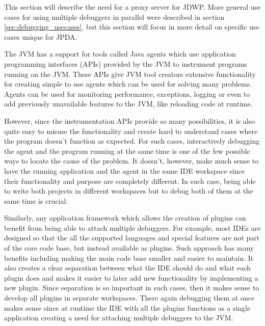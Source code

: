 \documentclass[..thesis.tex]{subfiles}
\begin{document}
This section will describe the need for a proxy server for JDWP.
More general use cases for using multiple debuggers in parallel were described in section \ref{sec:debugging_usecases}, but this section will focus in more detail on specific use cases unique for JPDA.

The JVM has a support for tools called Java agents which use application programming interfaces (APIs) provided by the JVM to instrument programs running on the JVM.
These APIs give JVM tool creators extensive functionality for creating simple to use agents which can be used for solving many problems.
Agents can be used for monitoring performance, exceptions, logging or even to add previously unavailable features to the JVM, like reloading code at runtime.

However, since the instrumentation APIs provide so many possibilities, it is also quite easy to misuse the functionality and create hard to understand cases where the program doesn't function as expected.
For such cases, interactively debugging the agent and the program running at the same time is one of the few possible ways to locate the cause of the problem.
It doesn't, however, make much sense to have the running application and the agent in the same IDE workspace since their functionality and purpose are completely different.
In such case, being able to write both projects in different workspaces but to debug both of them at the same time is crucial.

Similarly, any application framework which allows the creation of plugins can benefit from being able to attach multiple debuggers.
For example, most IDEs are designed so that the all the supported languages and special features are not part of the core code base, but instead available as plugins. 
Such approach has many benefits including making the main code base smaller and easier to maintain.
It also creates a clear separation between what the IDE should do and what each plugin does and makes it easier to later add new functionality by implementing a new plugin.
Since separation is so important in such cases, then it makes sense to develop all plugins in separate workspaces.
There again debugging them at once makes sense since at runtime the IDE with all the plugins functions as a single application creating a need for attaching multiple debuggers to the JVM.
\end{document}
